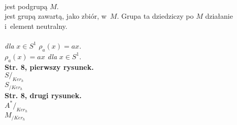 \documentclass[a4paper,11pt]{article}
\begin{document}
\noindent
{} \\
\Jest  jest podgrupą $M$. \\
\Powin jest grupą zawartą, jako zbiór, w~$M$. Grupa ta dziedziczy po $M$
działanie i~element neutralny. \\
 \\
\Jest  \textit{dla} $x \in S^{ 1 }$ $\rho_{ a }( x )= a x$. \\
\Powin $\rho_{ a }( x ) = a x$ \textit{dla} $x \in S^{ 1 }$. \\
\textbf{Str. 8, pierwszy rysunek.} \\
\Jest  $S /_{ Ker_{ h } }$ \\
\Powin $S_{ / Ker_{ h } }$ \\
\textbf{Str. 8, drugi rysunek.} \\
\Jest  $A^{ * } /_{ Ker_{ h } }$ \\
\Powin $M_{ / Ker_{ h } }$ \\


\vspace{\spaceTwo}












{}






\end{document}
